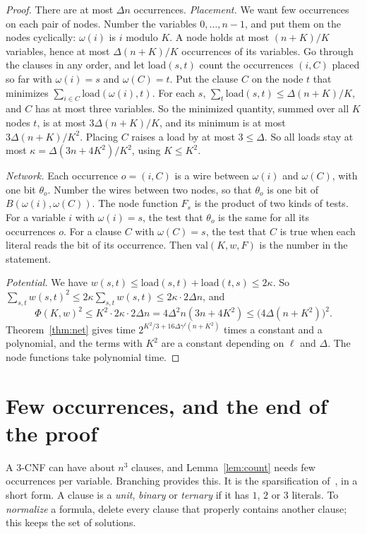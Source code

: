 \documentclass[11pt]{article}
\newcommand{\val}{\mathrm{val}}
\begin{document}
\begin{proof}
There are at most $\Delta n$ occurrences. \emph{Placement.} We want few occurrences on each pair of nodes. Number the variables $0,\dots,n-1$, and put them on the nodes cyclically: $\omega(i)$ is $i$ modulo $K$. A node holds at most $(n+K)/K$ variables, hence at most $\Delta(n+K)/K$ occurrences of its variables. Go through the clauses in any order, and let $\mathrm{load}(s,t)$ count the occurrences $(i,C)$ placed so far with $\omega(i)=s$ and $\omega(C)=t$. Put the clause $C$ on the node $t$ that minimizes $\sum_{i\in C}\mathrm{load}(\omega(i),t)$. For each $s$, $\sum_t\mathrm{load}(s,t)\le\Delta(n+K)/K$, and $C$ has at most three variables. So the minimized quantity, summed over all $K$ nodes $t$, is at most $3\Delta(n+K)/K$, and its minimum is at most $3\Delta(n+K)/K^2$. Placing $C$ raises a load by at most $3\le\Delta$. So all loads stay at most $\kappa=\Delta(3n+4K^2)/K^2$, using $K\le K^2$.

\emph{Network.} Each occurrence $o=(i,C)$ is a wire between $\omega(i)$ and $\omega(C)$, with one bit $\theta_o$. Number the wires between two nodes, so that $\theta_o$ is one bit of $B(\omega(i),\omega(C))$. The node function $F_s$ is the product of two kinds of tests. For a variable $i$ with $\omega(i)=s$, the test that $\theta_o$ is the same for all its occurrences $o$. For a clause $C$ with $\omega(C)=s$, the test that $C$ is true when each literal reads the bit of its occurrence. Then $\val(K,w,F)$ is the number in the statement.

\emph{Potential.} We have $w(s,t)\le\mathrm{load}(s,t)+\mathrm{load}(t,s)\le2\kappa$. So $\sum_{s,t}w(s,t)^2\le2\kappa\sum_{s,t}w(s,t)\le2\kappa\cdot2\Delta n$, and
\[
\Phi(K,w)^2\le K^2\cdot2\kappa\cdot2\Delta n=4\Delta^2n(3n+4K^2)\le\bigl(4\Delta(n+K^2)\bigr)^2.
\]
Theorem~\ref{thm:net} gives time $2^{K^2/3+16\Delta\gamma^\ell(n+K^2)}$ times a constant and a polynomial, and the terms with $K^2$ are a constant depending on $\ell$ and $\Delta$. The node functions take polynomial time.
\end{proof}

\section{Few occurrences, and the end of the proof}\label{sec:end}

A 3-CNF can have about $n^3$ clauses, and Lemma~\ref{lem:count} needs few occurrences per variable. Branching provides this. It is the sparsification of~\cite{IPZ01}, in a short form. A clause is a \emph{unit}, \emph{binary} or \emph{ternary} if it has $1$, $2$ or $3$ literals. To \emph{normalize} a formula, delete every clause that properly contains another clause; this keeps the set of solutions.
\end{document}
